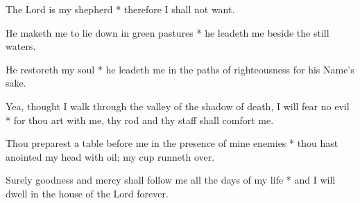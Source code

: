 The Lord is my shepherd * therefore I shall not want.

He maketh me to lie down in green pastures * he leadeth me beside the still waters.

He restoreth my soul * he leadeth me in the paths of righteousness for his Name's sake.

Yea, thought I walk through the valley of the shadow of death, I will fear no evil * for thou art with me, thy rod and thy staff shall comfort me.

Thou preparest a table before me in the presence of mine enemies * thou hast anointed my head with oil; my cup runneth over.

Surely goodness and mercy shall follow me all the days of my life * and I will dwell in the house of the Lord forever.